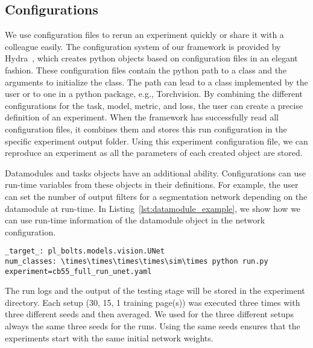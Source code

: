 \documentclass[runningheads]{llncs}
\begin{document}
\subsection{Configurations}\label{subsec:configs}
We use configuration files to rerun an experiment quickly or share it with a colleague easily.
The configuration system of our framework is provided by Hydra~\cite{yadanHydraFrameworkElegantly2019}, which creates python objects based on configuration files in an elegant fashion.
These configuration files contain the python path to a class and the arguments to initialize the class.
The path can lead to a class implemented by the user or to one in a python package, e.g., Torchvision.
By combining the different configurations for the task, model, metric, and loss, the user can create a precise definition of an experiment. 
When the framework has successfully read all configuration files, it combines them and stores this run configuration in the specific experiment output folder.
Using this experiment configuration file, we can reproduce an experiment as all the parameters of each created object are stored.

Datamodules and tasks objects have an additional ability. 
Configurations can use run-time variables from these objects in their definitions.
For example, the user can set the number of output filters for a segmentation network depending on the datamodule at run-time.
In Listing~\ref{lst:datamodule_example}, we show how we can use run-time information of the datamodule object in the network configuration.



\begin{lstlisting}[frame=single, caption={Usage of the datamodule variable \texttt{num\_classes} which is set during run-time.}, label={lst:datamodule_example}]
_target_: pl_bolts.models.vision.UNet
num_classes: \times\times\times\times\sim\times python run.py experiment=cb55_full_run_unet.yaml
\end{lstlisting}

The run logs and the output of the testing stage will be stored in the experiment directory.
Each setup (30, 15, 1 training page(s)) was executed three times with three different seeds and then averaged.
We used for the three different setups always the same three seeds for the runs.
Using the same seeds ensures that the experiments start with the same initial network weights.
\end{document}
